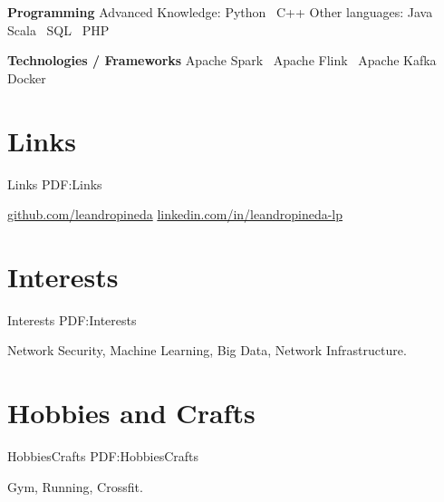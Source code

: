 \documentclass[letterpaper,MMMyyyy,nonstop]{simpleresumecv}
\begin{document}
\begin{body}
\textbf{Programming}
\BulletItem
Advanced Knowledge: Python \SubBulletSymbol\, C++
\BulletItem
Other languages: Java \SubBulletSymbol\, Scala \SubBulletSymbol\, SQL \SubBulletSymbol\, PHP

\textbf{Technologies / Frameworks}
\BulletItem Apache Spark \SubBulletSymbol\, Apache Flink \SubBulletSymbol\, Apache Kafka \SubBulletSymbol\, Docker


\section
{Links}
{Links}
{PDF:Links}

\BulletItem
\href{https://github.com/leandropineda}{github.com/leandropineda}
\BulletItem
\href{https://www.linkedin.com/in/leandropineda-lp}{linkedin.com/in/leandropineda-lp}


\section
{Interests}
{Interests}
{PDF:Interests}

Network Security, Machine Learning, Big Data, Network Infrastructure.



\section
{Hobbies \newline
	and Crafts}
{HobbiesCrafts}
{PDF:HobbiesCrafts}

Gym, Running, Crossfit.



\end{body}
\end{document}
